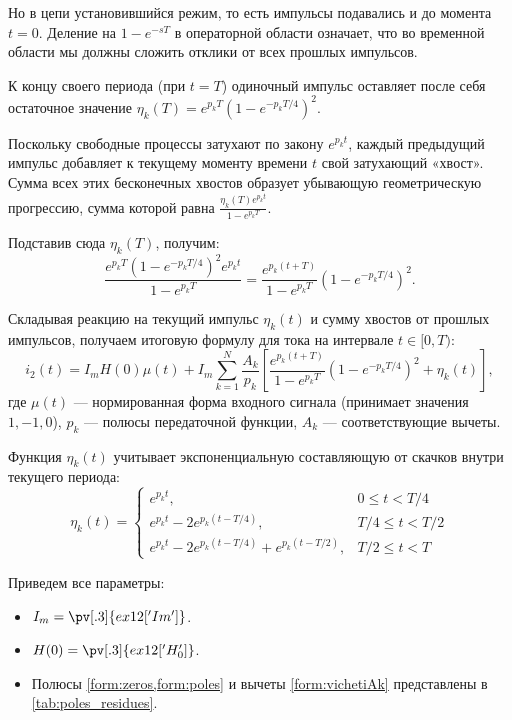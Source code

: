 Но в цепи установившийся режим, то есть импульсы подавались и до момента $t=0$. Деление на $1 - e^{-sT}$ в операторной области означает, что во временной области мы должны сложить отклики от всех прошлых импульсов. 

К концу своего периода (при $t=T$) одиночный импульс оставляет после себя остаточное значение $\eta_k(T) = e^{p_k T} \left(1 - e^{-p_k T/4}\right)^2$. 

Поскольку свободные процессы затухают по закону $e^{p_k t}$, каждый предыдущий импульс добавляет к текущему моменту времени $t$ свой затухающий «хвост». Сумма всех этих бесконечных хвостов образует убывающую геометрическую прогрессию, сумма которой равна $\frac{\eta_k(T) e^{p_k t}}{1 - e^{p_k T}}$. 

Подставив сюда $\eta_k(T)$, получим:
\begin{equation}
   \frac{e^{p_k T} \left(1 - e^{-p_k T/4}\right)^2 e^{p_k t}}{1 - e^{p_k T}} = \frac{e^{p_k (t + T)}}{1 - e^{p_k T}} \left(1 - e^{-p_k T/4}\right)^2. 
\end{equation}

Складывая реакцию на текущий импульс $\eta_k(t)$ и сумму хвостов от прошлых импульсов, получаем итоговую формулу для тока на интервале $t \in [0, T)$:
\begin{equation}
    i_{2}(t) = I_m H(0) \mu(t) + I_m \sum_{k=1}^{N} \frac{A_k}{p_k} \left[ \frac{e^{p_k (t + T)}}{1 - e^{p_k T}} \left(1 - e^{-p_k T/4}\right)^2 + \eta_k(t) \right],
    \label{form:zamkn}
\end{equation}
где $\mu(t)$ — нормированная форма входного сигнала (принимает значения $1, -1, 0$), $p_k$ — полюсы передаточной функции, $A_k$ — соответствующие вычеты.

Функция $\eta_k(t)$ учитывает экспоненциальную составляющую от скачков внутри текущего периода:
$$ \eta_k(t) = \begin{cases}
    e^{p_k t}, & 0 \le t < T/4 \\
    e^{p_k t} - 2e^{p_k(t - T/4)}, & T/4 \le t < T/2 \\
    e^{p_k t} - 2e^{p_k(t - T/4)} + e^{p_k(t - T/2)}, & T/2 \le t < T
\end{cases} $$

Приведем все параметры:
\begin{itemize}
    \item $I_m = \pv[.3]{ex12['Im']}$.
    \item $H(0) = \pv[.3]{ex12['H_0']}$.
    \item Полюсы \cref{form:zeros,form:poles} и вычеты \cref{form:vichetiAk} представлены в \cref{tab:poles_residues}.
\end{itemize}

